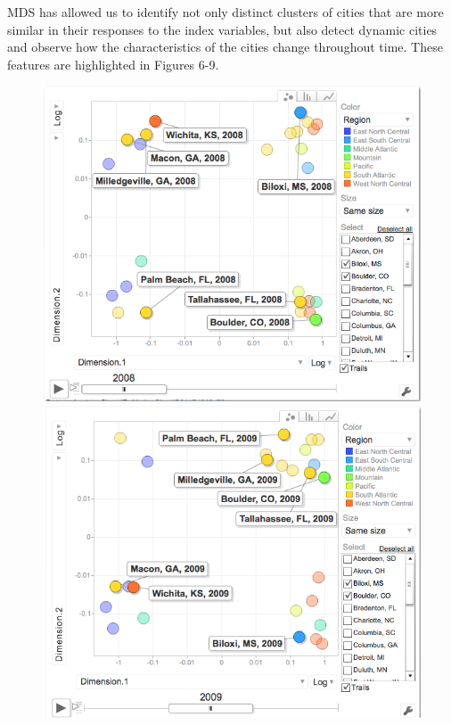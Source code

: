 \documentclass[11pt]{asaproc}
\begin{document}
MDS has allowed us to identify not only distinct
clusters of cities that are more similar in their responses to the
index variables, but also detect dynamic cities and observe how the
characteristics of the cities change throughout time. These features
are highlighted in Figures 6-9. 

\begin{figure}[ht]
\begin{framed}
\begin{minipage}[b]{0.45\linewidth}
\centering
\includegraphics[width=\textwidth]{mdsmeans08.png}
\end{minipage}
\hspace{0.5cm}
\begin{minipage}[b]{0.45\linewidth}
\centering
\includegraphics[width=\textwidth]{mdsmeans09.png}

\end{minipage}
\end{framed}
\end{figure}
\end{document}
